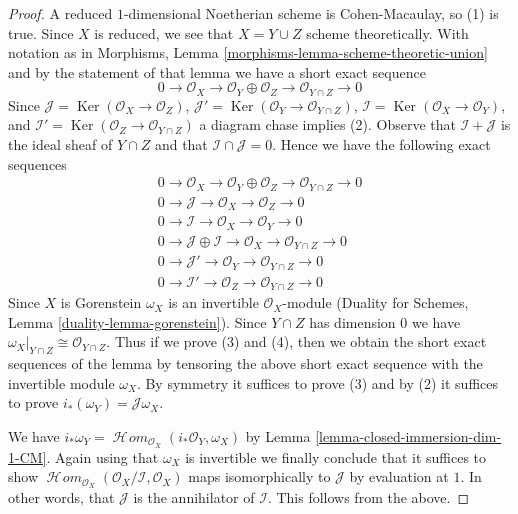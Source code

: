 \documentclass{stacks-project}
\theoremstyle{plain}
\theoremstyle{definition}
\theoremstyle{remark}
\numberwithin{equation}{subsection}
\def\SheafHom{\mathop{\mathcal{H}\!\mathit{om}}\nolimits}
\def\Ker{\mathop{\mathrm{Ker}}}
\begin{document}
\begin{proof}
A reduced $1$-dimensional Noetherian scheme is Cohen-Macaulay, so
(1) is true. Since $X$ is reduced, we see that $X = Y \cup Z$
scheme theoretically. With notation as in
Morphisms, Lemma \ref{morphisms-lemma-scheme-theoretic-union}
and by the statement of that lemma
we have a short exact sequence
$$
0 \to \mathcal{O}_X \to
\mathcal{O}_Y \oplus \mathcal{O}_Z \to \mathcal{O}_{Y \cap Z} \to 0
$$
Since $\mathcal{J} = \Ker(\mathcal{O}_X \to \mathcal{O}_Z)$,
$\mathcal{J}' = \Ker(\mathcal{O}_Y \to \mathcal{O}_{Y \cap Z})$,
$\mathcal{I} = \Ker(\mathcal{O}_X \to \mathcal{O}_Y)$, and
$\mathcal{I}' = \Ker(\mathcal{O}_Z \to \mathcal{O}_{Y \cap Z})$
a diagram chase implies (2).
Observe that $\mathcal{I} + \mathcal{J}$ is the ideal sheaf
of $Y \cap Z$ and that $\mathcal{I} \cap \mathcal{J} = 0$.
Hence we have the following exact sequences
\begin{align*}
0 \to \mathcal{O}_X \to \mathcal{O}_Y \oplus \mathcal{O}_Z \to
\mathcal{O}_{Y \cap Z} \to 0 \\
0 \to \mathcal{J} \to \mathcal{O}_X \to \mathcal{O}_Z \to 0 \\
0 \to \mathcal{I} \to \mathcal{O}_X \to \mathcal{O}_Y \to 0 \\
0 \to \mathcal{J} \oplus \mathcal{I} \to \mathcal{O}_X \to
\mathcal{O}_{Y \cap Z} \to 0 \\
0 \to \mathcal{J}' \to \mathcal{O}_Y \to \mathcal{O}_{Y \cap Z} \to 0 \\
0 \to \mathcal{I}' \to \mathcal{O}_Z \to \mathcal{O}_{Y \cap Z} \to 0
\end{align*}
Since $X$ is Gorenstein $\omega_X$ is an invertible $\mathcal{O}_X$-module
(Duality for Schemes, Lemma \ref{duality-lemma-gorenstein}).
Since $Y \cap Z$ has dimension $0$ we have
$\omega_X|_{Y \cap Z} \cong \mathcal{O}_{Y \cap Z}$.
Thus if we prove (3) and (4), then we obtain the short exact
sequences of the lemma by tensoring the above
short exact sequence with the invertible module $\omega_X$.
By symmetry it suffices to prove (3) and by
(2) it suffices to prove $i_*(\omega_Y) = \mathcal{J}\omega_X$.

\medskip\noindent
We have
$i_*\omega_Y = \SheafHom_{\mathcal{O}_X}(i_*\mathcal{O}_Y, \omega_X)$
by Lemma \ref{lemma-closed-immersion-dim-1-CM}.
Again using that $\omega_X$ is invertible
we finally conclude that it suffices to show
$\SheafHom_{\mathcal{O}_X}(\mathcal{O}_X/\mathcal{I}, \mathcal{O}_X)$
maps isomorphically to $\mathcal{J}$ by evaluation at $1$.
In other words, that $\mathcal{J}$ is the annihilator of
$\mathcal{I}$. This follows from the above.
\end{proof}
\end{document}
